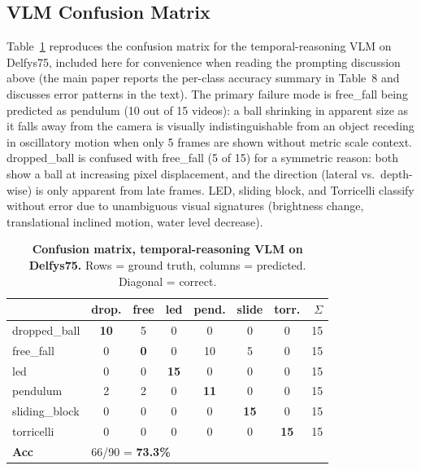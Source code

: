 \documentclass[runningheads]{llncs}
\begin{document}
\subsection{VLM Confusion Matrix}
\label{app:vlm_confusion}

Table~\ref{tab:vlm_conf_temporal} reproduces the confusion matrix for the
temporal-reasoning VLM on Delfys75, included here for convenience when
reading the prompting discussion above (the main paper reports the per-class
accuracy summary in Table~8 and discusses error patterns in the text).
The primary failure mode is free\_fall being predicted as pendulum
(10 out of 15 videos): a ball shrinking in apparent size as it falls away
from the camera is visually indistinguishable from an object receding in
oscillatory motion when only 5 frames are shown without metric scale context.
dropped\_ball is confused with free\_fall (5 of 15) for a symmetric reason:
both show a ball at increasing pixel displacement, and the direction
(lateral vs.\ depth-wise) is only apparent from late frames.
LED, sliding block, and Torricelli classify without error due to
unambiguous visual signatures (brightness change, translational inclined
motion, water level decrease).

\begin{table}[h]
  \centering
  \caption{\textbf{Confusion matrix, temporal-reasoning VLM on Delfys75.}
  Rows = ground truth, columns = predicted.  Diagonal = correct.}
  \label{tab:vlm_conf_temporal}
  \footnotesize
  \begin{tabular}{@{}l|cccccc|r@{}}
    \toprule
    & \textbf{drop.} & \textbf{free} & \textbf{led}
      & \textbf{pend.} & \textbf{slide} & \textbf{torr.} & $\Sigma$ \\
    \midrule
    dropped\_ball & \textbf{10} &  5 & 0 &  0 &  0 & 0 & 15 \\
    free\_fall    &  0 &  \textbf{0} & 0 & 10 &  5 & 0 & 15 \\
    led           &  0 &  0 & \textbf{15} &  0 &  0 & 0 & 15 \\
    pendulum      &  2 &  2 & 0 & \textbf{11} &  0 & 0 & 15 \\
    sliding\_block &  0 &  0 & 0 &  0 & \textbf{15} & 0 & 15 \\
    torricelli    &  0 &  0 & 0 &  0 &  0 & \textbf{15} & 15 \\
    \midrule
    \textbf{Acc} & \multicolumn{6}{l}{66/90 = \textbf{73.3\%}} & \\
    \bottomrule
  \end{tabular}
\end{table}
\end{document}
